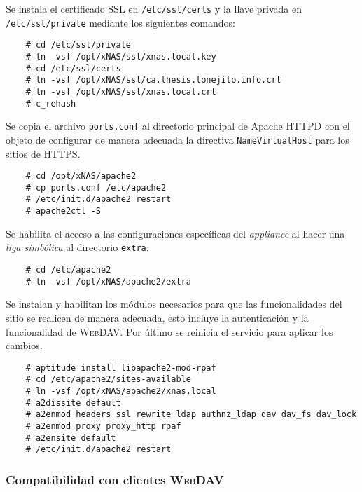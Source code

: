 Se instala el certificado \textsc{SSL} en \texttt{/etc/ssl/certs} y la llave privada en \texttt{/etc/ssl/private} mediante los siguientes comandos:

{
\scriptsize
\linespread{1}
\begin{verbatim}
    # cd /etc/ssl/private
    # ln -vsf /opt/xNAS/ssl/xnas.local.key
    # cd /etc/ssl/certs
    # ln -vsf /opt/xNAS/ssl/ca.thesis.tonejito.info.crt
    # ln -vsf /opt/xNAS/ssl/xnas.local.crt
    # c_rehash
\end{verbatim}
}

Se copia el archivo \texttt{ports.conf} al directorio principal de Apache \textsc{HTTPD} con el objeto de configurar de manera adecuada la directiva \texttt{NameVirtualHost} para los sitios de \textsc{HTTPS}.

{
\scriptsize
\linespread{1}
\begin{verbatim}
    # cd /opt/xNAS/apache2
    # cp ports.conf /etc/apache2
    # /etc/init.d/apache2 restart
    # apache2ctl -S
\end{verbatim}
}

Se habilita el acceso a las configuraciones espec\'{i}ficas del \textit{appliance} al hacer una \textit{liga simb\'{o}lica} al directorio \texttt{extra}:

{
\scriptsize
\linespread{1}
\begin{verbatim}
    # cd /etc/apache2
    # ln -vsf /opt/xNAS/apache2/extra
\end{verbatim}
}

Se instalan y habilitan los m\'{odulos} necesarios para que las funcionalidades del sitio se realicen de manera adecuada, esto incluye la autenticaci\'{o}n y la funcionalidad de \textsc{WebDAV}. Por \'{u}ltimo se reinicia el servicio para aplicar los cambios.

{
\scriptsize
\linespread{1}
\begin{verbatim}
    # aptitude install libapache2-mod-rpaf
    # cd /etc/apache2/sites-available
    # ln -vsf /opt/xNAS/apache2/xnas.local
    # a2dissite default
    # a2enmod headers ssl rewrite ldap authnz_ldap dav dav_fs dav_lock
    # a2enmod proxy proxy_http rpaf
    # a2ensite default
    # /etc/init.d/apache2 restart
\end{verbatim}
}

        \subsubsection {Compatibilidad con clientes \textsc{WebDAV}}

